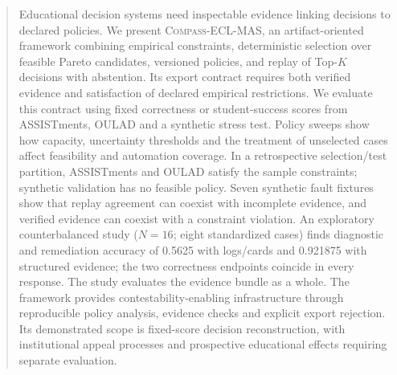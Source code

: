 \documentclass[sigconf,nonacm,balance=false]{acmart}
\newcommand{\compa}{\textsc{Compass}}
\newcommand{\ecl}{\textsc{ECL}}
\newcommand{\mas}{\textsc{MAS}}
\begin{document}

\begin{abstract}
Educational decision systems need inspectable evidence linking decisions to declared policies. We present \compa-\ecl-\mas, an artifact-oriented framework combining empirical constraints, deterministic selection over feasible Pareto candidates, versioned policies, and replay of Top-$K$ decisions with abstention. Its export contract requires both verified evidence and satisfaction of declared empirical restrictions. We evaluate this contract using fixed correctness or student-success scores from ASSISTments, OULAD and a synthetic stress test. Policy sweeps show how capacity, uncertainty thresholds and the treatment of unselected cases affect feasibility and automation coverage. In a retrospective selection/test partition, ASSISTments and OULAD satisfy the sample constraints; synthetic validation has no feasible policy. Seven synthetic fault fixtures show that replay agreement can coexist with incomplete evidence, and verified evidence can coexist with a constraint violation. An exploratory counterbalanced study ($N=16$; eight standardized cases) finds diagnostic and remediation accuracy of 0.5625 with logs/cards and 0.921875 with structured evidence; the two correctness endpoints coincide in every response. The study evaluates the evidence bundle as a whole. The framework provides contestability-enabling infrastructure through reproducible policy analysis, evidence checks and explicit export rejection. Its demonstrated scope is fixed-score decision reconstruction, with institutional appeal processes and prospective educational effects requiring separate evaluation.
\end{abstract}

\maketitle
{}
\raggedbottom









\clearpage
\twocolumn








\end{document}

